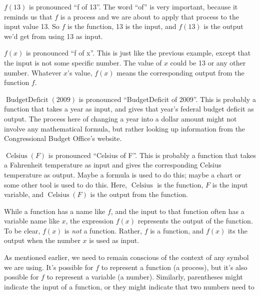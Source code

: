 %
\begin{example}
$f(\num{13})$ is pronounced ``f of 13''. The word ``of'' is very important,
        		because it reminds us that $f$ is a process and we are about to apply that
        		process to the input value \num{13}. So $f$ is the function, \num{13} is the
        		input, and $f(\num{13})$ is the output we'd get from using \num{13} as input.
%
\par $f(x)$ is pronounced ``f of x''. This is just like the previous example,
        		except that the input is not some specific number. The value of $x$ could be
        		\num{13} or any other number. Whatever $x$'s value, $f(x)$ means the corresponding
        		output from the function $f$.
%
\par $\operatorname{BudgetDeficit}(2009)$ is pronounced ``BudgetDeficit of 2009''.
        		This is probably a function that takes a year as input, and gives that
        		year's federal budget deficit as output. The process here of changing a year
        		into a dollar amount might not involve any mathematical formula, but rather
        		looking up information from the Congressional Budget Office's website.
%
\par $\operatorname{Celsius}(F)$ is pronounced ``Celsius of F''. This is probably
        		a function that takes a Fahrenheit temperature as input and gives the
        		corresponding Celsius temperature as output. Maybe a formula is used to do this;
        		maybe a chart or some other tool is used to do this. Here, $\operatorname{Celsius}$
        		is the function, $F$ is the input variable, and $\operatorname{Celsius}(F)$ is the output from the function.
%
\end{example}
%
\begin{specialnote}
While a function has a name like $f$, and the input to that function often
                	has a variable name like $x$, the expression $f(x)$ represents the output of
                	the function. To be clear, $f(x)$ is \emph{not} a function. Rather, $f$ is a
                	function, and $f(x)$ its the output when the number $x$ is used as input.\end{specialnote}
%
\par As mentioned earlier, we need to remain conscious of the context of any symbol we
       		are using. It's possible for $f$ to represent a function (a process), but it's also
       		possible for $f$ to represent a variable (a number). Similarly, parentheses might
       		indicate the input of a function, or they might indicate that two numbers need to
